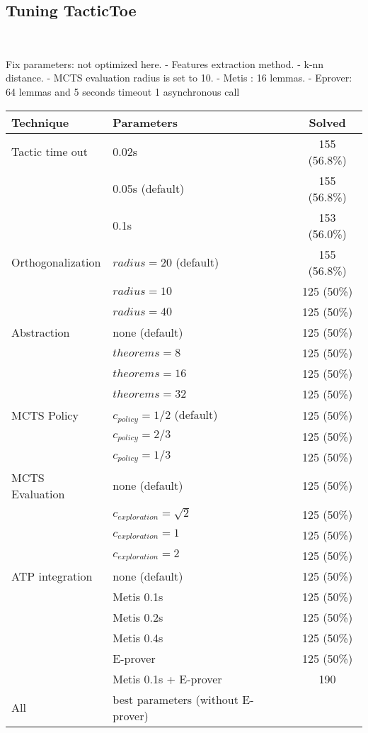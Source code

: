 \documentclass[runningheads,a4paper,draft]{svjour3}
\def\eprover{\textsf{E-prover}\xspace}
\def\metis{\textsf{Metis}\xspace}
\def\tactictoe{\textsf{TacticToe}\xspace}
\newcommand{\ra}[1]{\renewcommand{\arraystretch}{#1}}
\begin{document}
\subsection{Tuning \tactictoe}~\label{sec:tuning}

Fix parameters: not optimized here. 
 - Features extraction method.
 - k-nn distance.
 - MCTS evaluation radius is set to 10. 
 - Metis : 16 lemmas.
 - Eprover: 64 lemmas and 5 seconds timeout 1 asynchronous call



\begin{table}[ht]
\centering\ra{1.3}
\small
\begin{tabular}{llc}
\toprule
 Technique & Parameters & Solved \\
\midrule
Tactic time out & 0.02s & 155 (56.8\%)\\
                & 0.05s (default) & 155 (56.8\%)\\
                & 0.1s & 153 (56.0\%)\\
\midrule
Orthogonalization & $radius = 20$ (default) & 155 (56.8\%)\\ 
                  & $radius = 10$ & 125 (50\%)\\
                  & $radius = 40$ & 125 (50\%)\\
\midrule
Abstraction       & none (default) & 125 (50\%)\\
                  & $theorems = 8$ & 125 (50\%)\\
                  & $theorems = 16$ & 125 (50\%)\\
                  & $theorems = 32$ & 125 (50\%)\\
\midrule
MCTS Policy & $c_{policy} = 1/2$ (default) & 125 (50\%)\\
            & $c_{policy} = 2/3$ & 125 (50\%)\\
            & $c_{policy} = 1/3$ & 125 (50\%)\\
\midrule
MCTS Evaluation & none (default) & 125 (50\%) \\
           & $c_{exploration} =\sqrt{2}$ & 125 (50\%)\\ 
           & $c_{exploration} = 1$ & 125 (50\%)\\ 
           & $c_{exploration} = 2$ & 125 (50\%)\\ 
\midrule
ATP integration & none (default) & 125 (50\%)\\
                & \metis 0.1s & 125 (50\%)\\
                & \metis 0.2s & 125 (50\%)\\
                & \metis 0.4s & 125 (50\%)\\ 
                & \eprover & 125 (50\%)\\
                & \metis 0.1s + \eprover & 190\\
\midrule
All & best parameters (without \eprover) & \\ 
\bottomrule
\end{tabular}
\end{table}
\end{document}
